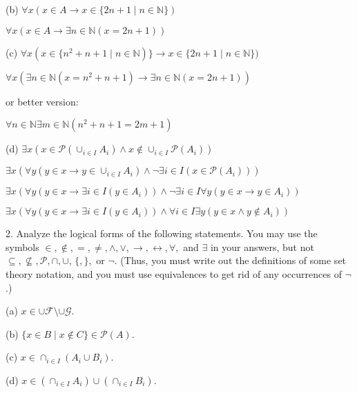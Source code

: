 \documentclass{article}
\begin{document}
\vspace{20pt}

(b) $\forall x (x \in A \to x \in \{2n + 1 \mid n \in \mathbb{N}\})$

$\forall x (x \in A \to \exists n \in \mathbb{N} (x = 2n + 1))$

\vspace{20pt}

(c) $\forall x (x \in \{n^2 + n + 1 \mid n \in \mathbb{N})\} \to x \in \{2n + 1 \mid n \in \mathbb{N}\})$

$\forall x (\exists n \in \mathbb{N} (x = n^2 + n + 1) \to \exists n \in \mathbb{N} (x = 2n + 1))$

or better version:

$\forall n \in \mathbb{N} \exists m \in \mathbb{N}(n^2 + n + 1 = 2m + 1)$

\vspace{20pt}

(d) $\exists x (x \in \mathcal{P}(\cup_{i \in I} A_i) \land x \notin \cup_{i \in I} \mathcal{P} (A_i))$

$\exists x (\forall y (y  \in x \to y \in \cup_{i \in I} A_i) \land \neg \exists i \in I(x \in \mathcal{P} (A_i)))$

$\exists x (\forall y (y \in x \to \exists i \in I (y \in A_i)) \land \neg \exists i \in I \forall y (y \in x \to y \in A_i))$

$\exists x (\forall y (y \in x \to \exists i \in I (y \in A_i)) \land \forall i \in I \exists y (y \in x \land y \notin A_i))$

\vspace{30pt}

2. Analyze the logical forms of the following statements. You may use the
symbols $\in , \notin, =, \neq, \land, \lor, \to, \leftrightarrow, \forall,$ and $\exists$ in your answers, but not
$\subseteq, \nsubseteq, \mathcal{P}, \cap, \cup, \, \{, \},$ or $\neg$. (Thus, you must write out the definitions
of some set theory notation, and you must use equivalences to get rid of
any occurrences of $\neg$.)

\hspace{12pt}(a) $x \in \cup \mathcal{F} \setminus \cup \mathcal{G}$.

\hspace{12pt}(b) $\{x \in B \mid x \notin C\} \in \mathcal{P}(A)$.

\hspace{12pt}(c) $x \in \cap_{i \in I} (A_i \cup B_i)$.

\hspace{12pt}(d) $x \in (\cap_{i \in I} A_i) \cup (\cap_{i \in I} B_i)$.
\vspace{30pt}
\end{document}
